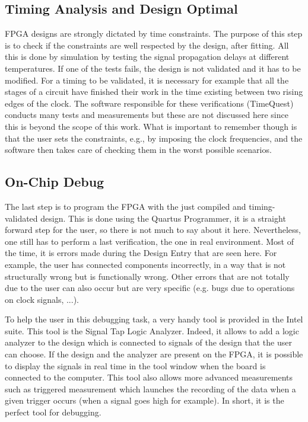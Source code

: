 \subsection{Timing Analysis and Design Optimal}

FPGA designs are strongly dictated by time constraints. The purpose of this step is to check if the 
constraints are well respected by the design, after fitting. All this is done by simulation by 
testing the signal propagation delays at different temperatures. If one of the tests fails, the 
design is not validated and it has to be modified. For a timing to be validated, it is 
necessary for example that all the stages of a circuit have finished their work in the time existing 
between two rising edges of the clock. The software responsible for these verifications (TimeQuest) 
conducts many tests and measurements but these are not discussed here since this is beyond the 
scope of this work.  What is important to remember though is that the user sets the constraints, e.g., by imposing the clock 
frequencies, and the software then takes care of checking them in the worst possible 
scenarios. 

\subsection{On-Chip Debug}

The last step is to program the FPGA with the just compiled and timing-validated design. This is done
using the Quartus Programmer, it is a straight forward step for the user, so there is not much to say
about it here.  Nevertheless, one still has to perform a last verification, the one in real environment. 
Most of the time, it is errors made during the Design Entry that are seen here. For 
example, the user has connected components incorrectly, in a way that is not structurally 
wrong but is functionally wrong. Other errors that are not totally due to the user can also occur 
but are very specific (e.g. bugs due to operations on clock signals, ...).

To help the user in this debugging task, a very handy tool is provided in the Intel suite. This 
tool is the Signal Tap Logic Analyzer. Indeed, it allows to add a logic analyzer to the design 
which is connected to signals of the design that the user can choose. If the design and the 
analyzer are present on the FPGA, it is possible to display the signals in real time in the tool 
window when the board is connected to the computer. This tool also allows more advanced 
measurements such as triggered measurement which launches the recording of the data when a given
trigger occurs (when a signal goes high for example). In short, it is the perfect tool for debugging.
